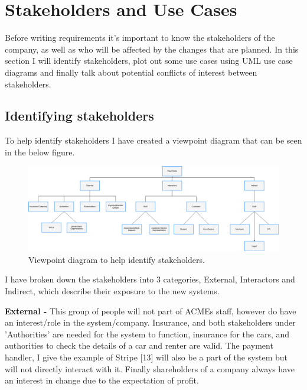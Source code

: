 \section{Stakeholders and Use Cases}
  Before writing requirements it's important to know the stakeholders of the company, as well as who will be affected by the changes that are planned.
  In this section I will identify stakeholders, plot out some use cases using UML use case diagrams and finally talk about potential conflicts of
  interest between stakeholders.

  \subsection{Identifying stakeholders}
    To help identify stakeholders I have created a viewpoint diagram that can be seen in the below figure.
    \begin{figure}[H]
      \centering
      \includegraphics[width=12cm]{diagrams/viewpoints.drawio.png}
      \caption{Viewpoint diagram to help identify stakeholders.}
      \label{fig:viewpoint}
    \end{figure}

    I have broken down the stakeholders into 3 categories, External, Interactors and Indirect, which describe their
    exposure to the new systems.

    \vspace{0.2cm}

    \noindent\textbf{External -} This group of people will not part of ACMEs staff, however do have an interest/role in the system/company. Insurance, 
    and both stakeholders under 'Authorities' are needed for the system to function, insurance for the cars, and authorities to
    check the details of a car and renter are valid. The payment handler, I give the example of Stripe [13] will also be a part of the system
    but will not directly interact with it. Finally shareholders of a company always have an interest in change due to the expectation of profit.

    \vspace{0.2cm}

